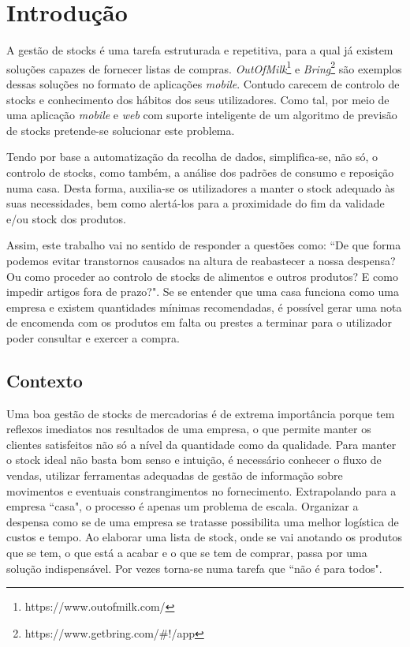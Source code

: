 %
%
\chapter{Introdução} \label{cap1}

A gestão de stocks é uma tarefa estruturada e repetitiva, para a qual já existem soluções capazes de fornecer listas de compras. \textit{OutOfMilk}\footnote[1]{https://www.outofmilk.com/} e \textit{Bring}\footnote[2]{https://www.getbring.com/\#!/app} são exemplos dessas soluções no formato de aplicações \textit{mobile}. Contudo carecem de controlo de stocks e conhecimento dos hábitos dos seus utilizadores.  Como tal, por meio de uma aplicação \textit{mobile} e \textit{web} com suporte inteligente de um algoritmo de previsão de stocks pretende-se solucionar este problema.

Tendo por base a automatização da recolha de dados, simplifica-se, não só, o controlo de stocks, como também, a análise dos padrões de consumo e reposição numa casa.
Desta forma, auxilia-se os utilizadores a manter o stock adequado às suas necessidades, bem como alertá-los para a proximidade do fim da validade e/ou stock dos produtos. 

Assim, este trabalho vai no sentido de responder a questões como: ``De que forma podemos evitar transtornos causados na altura de reabastecer a nossa despensa? Ou como proceder ao controlo de stocks de alimentos e outros produtos? E como impedir artigos fora de prazo?". Se se entender que uma casa funciona como uma empresa e existem quantidades mínimas recomendadas, é possível gerar uma nota de encomenda com os produtos em falta ou prestes a terminar para o utilizador poder consultar e exercer a compra.

%
%
\section{Contexto} \label{sec11}

Uma boa gestão de stocks de mercadorias é de extrema importância porque tem reflexos imediatos nos resultados de uma empresa, o que permite manter os clientes satisfeitos não só a nível da quantidade como da qualidade. Para manter o stock ideal não basta bom senso e intuição, é necessário conhecer o fluxo de vendas, utilizar ferramentas adequadas de gestão de informação sobre movimentos e eventuais constrangimentos no fornecimento. Extrapolando para a empresa ``casa", o processo é apenas um problema de escala. Organizar a despensa como se de uma empresa se tratasse possibilita uma melhor logística de custos e tempo. Ao elaborar uma lista de stock, onde se vai anotando os produtos que se tem, o que está a acabar e o que se tem de comprar, passa por uma solução indispensável. Por vezes torna-se numa tarefa que ``não é para todos".

